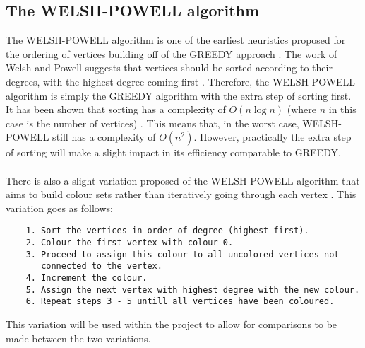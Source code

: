 \subsection{The WELSH-POWELL algorithm}
The WELSH-POWELL algorithm is one of the earliest heuristics proposed for the ordering of vertices building off of the GREEDY approach \cite{LEWIS20121933}. The work of Welsh and Powell suggests that vertices should be sorted according to their degrees, with the highest degree coming first \cite{WelshPowell}. Therefore, the WELSH-POWELL algorithm is simply the GREEDY algorithm with the extra step of sorting first. It has been shown that sorting has a complexity of $O(n \log n)$ (where $n$ in this case is the number of vertices) \cite{IntroAlgs}. This means that, in the worst case, WELSH-POWELL still has a complexity of $O(n^2)$. However, practically the extra step of sorting will make a slight impact in its efficiency comparable to GREEDY. 
\\\\
There is also a slight variation proposed of the WELSH-POWELL algorithm that aims to build colour sets rather than iteratively going through each vertex \cite{GFGWP}. This variation goes as follows:
\begin{verbatim}
    1. Sort the vertices in order of degree (highest first).
    2. Colour the first vertex with colour 0.
    3. Proceed to assign this colour to all uncolored vertices not 
       connected to the vertex.
    4. Increment the colour.
    5. Assign the next vertex with highest degree with the new colour.
    6. Repeat steps 3 - 5 untill all vertices have been coloured. 
\end{verbatim}
This variation will be used within the project to allow for comparisons to be made between the two variations. 

